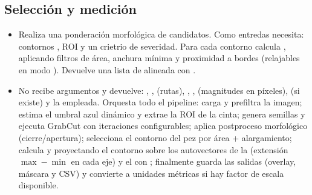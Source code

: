 \documentclass[a4paper,10pt,spanish]{jupyterBook}
\begin{document}
\subsection{Selección y medición}
\label{\detokenize{content/01/Modulo-3:seleccion-y-medicion}}\begin{itemize}
\item {}
\sphinxAtStartPar
{} Realiza una ponderación morfológica de candidatos. Como entredas necesita: contornos , ROI  y un crietrio de severidad. Para cada contorno calcula , aplicando filtros de área, anchura mínima y proximidad a bordes (relajables en modo ). Devuelve una lista de  alineada con .

\item {}
\sphinxAtStartPar
{} No recibe argumentos y devuelve: , ,  (rutas), , ,  (magnitudes en píxeles),  (si existe) y la  empleada. Orquesta todo el pipeline: carga y prefiltra la imagen; estima el umbral azul dinámico y extrae la ROI de la cinta; genera semillas y ejecuta GrabCut con iteraciones configurables; aplica postproceso morfológico (cierre/apertura); selecciona el contorno del pez por área + alargamiento; calcula  y  proyectando el contorno sobre los autovectores de la  (extensión \(\max-\min\) en cada eje) y el  con ; finalmente guarda las salidas (overlay, máscara y CSV) y convierte a unidades métricas si hay factor de escala disponible.

\end{itemize}
\end{document}
